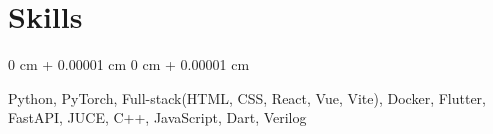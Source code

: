 \documentclass[10pt, letterpaper]{article}
\newenvironment{highlights}{
    \begin{itemize}[
        topsep=0.10 cm,
        parsep=0.10 cm,
        partopsep=0pt,
        itemsep=0pt,
        leftmargin=0 cm + 10pt
    ]
}{
    \end{itemize}
} %
\newenvironment{onecolentry}{
    \begin{adjustwidth}{
        0 cm + 0.00001 cm
    }{
        0 cm + 0.00001 cm
    }
}{
    \end{adjustwidth}
} %
\begin{document}
    
    \section{Skills}
    
    \begin{onecolentry}
        Python, PyTorch, Full-stack(HTML, CSS, React, Vue, Vite), Docker, Flutter, FastAPI, JUCE, C++, JavaScript, Dart, Verilog
    \end{onecolentry}
\end{document}
